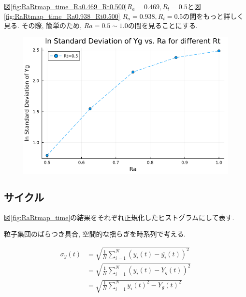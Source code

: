 図\ref{fig:RaRtmap_time_Ra0.469_Rt0.500}$R_a = 0.469, R_t = 0.5$と図\ref{fig:RaRtmap_time_Ra0.938_Rt0.500} $R_a = 0.938, R_t = 0.5$の間をもっと詳しく見る. その際, 簡単のため, $Ra =0.5 \sim 1.0$の間を見ることにする.



\begin{figure}[H]
  \centering
  \includegraphics[scale=0.5]{image/lnStdYg_Ra0.5to1.0_Rt0.5_ti25000.png}
  \caption{}
  \label{}
\end{figure}

\subsection{サイクル}

図\ref{fig:RaRtmap_time}の結果をそれぞれ正規化したヒストグラムにして表す.



粒子集団のばらつき具合, 空間的な揺らぎを時系列で考える.

\begin{align}
  \sigma_{y} (t)
  &= \sqrt{\frac{1}{N} \sum_{i=1}^{N} (y_i (t) - \bar{y_i}(t) )^2} \\
  &= \sqrt{\frac{1}{N} \sum_{i=1}^{N} (y_i (t) - Y_g (t) )^2} \\
  &= \sqrt{\frac{1}{N} \sum_{i=1}^{N} {{y_i} (t)}^2 - {{Y_g} (t)}^2}
\end{align}


















